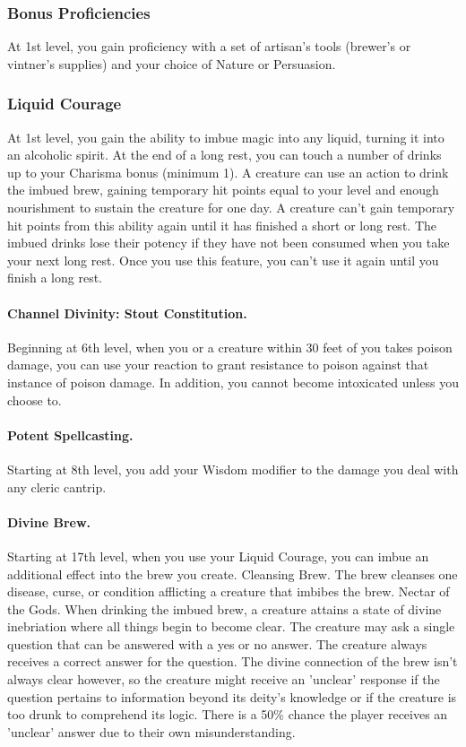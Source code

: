 \documentclass[10pt,a4paper,twoside,twocolumn,openany,bg=print,nodeprecatedcode]{dndbook}
\begin{document}
\subsubsection{Bonus Proficiencies}
At 1st level, you gain proficiency with a set of artisan's tools (brewer's or vintner's supplies) and your choice of Nature or Persuasion.
\subsubsection{Liquid Courage}
At 1st level, you gain the ability to imbue magic into any liquid, turning it into an alcoholic spirit. At the end of a long rest, you can touch a number of drinks up to your Charisma bonus (minimum 1). A creature can use an action to drink the imbued brew, gaining temporary hit points equal to your level and enough nourishment to sustain the creature for one day. A creature can't gain temporary hit points from this ability again until it has finished a short or long rest. The imbued drinks lose their potency if they have not been consumed when you take your next long rest.
Once you use this feature, you can't use it again until you finish a long rest.
\paragraph{Channel Divinity: Stout Constitution.}
Beginning at 6th level, when you or a creature within 30 feet of you takes poison damage, you can use your reaction to grant resistance to poison against that instance of poison damage.
In addition, you cannot become intoxicated unless you choose to.
\paragraph{Potent Spellcasting.}
Starting at 8th level, you add your Wisdom modifier to the damage you deal with any cleric cantrip.
\paragraph{Divine Brew.}
Starting at 17th level, when you use your Liquid Courage, you can imbue an additional effect into the brew you create.
Cleansing Brew. The brew cleanses one disease, curse, or condition afflicting a creature that imbibes the brew.
Nectar of the Gods. When drinking the imbued brew, a creature attains a state of divine inebriation where all things begin to become clear. The creature may ask a single question that can be answered with a yes or no answer. The creature always receives a correct answer for the question.
The divine connection of the brew isn't always clear however, so the creature might receive an 'unclear' response if the question pertains to information beyond its deity's knowledge or if the creature is too drunk to comprehend its logic. There is a 50\% chance the player receives an 'unclear' answer due to their own misunderstanding.
\end{document}
